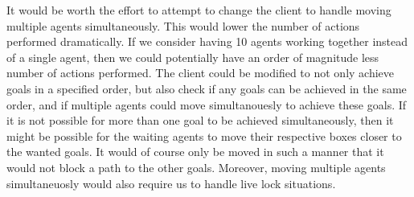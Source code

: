 It would be worth the effort to attempt to change the client to handle moving multiple agents simultaneously.
This would lower the number of actions performed dramatically.
If we consider having 10 agents working together instead of a single agent, then we could potentially have an order of magnitude less number of actions performed.
The client could be modified to not only achieve goals in a specified order, but also check if any goals can be achieved in the same order, and if multiple agents could move simultanouesly to achieve these goals.
If it is not possible for more than one goal to be achieved simultaneously, then it might be possible for the waiting agents to move their respective boxes closer to the wanted goals.
It would of course only be moved in such a manner that it would not block a path to the other goals.
Moreover, moving multiple agents simultaneuosly would also require us to handle live lock situations.
